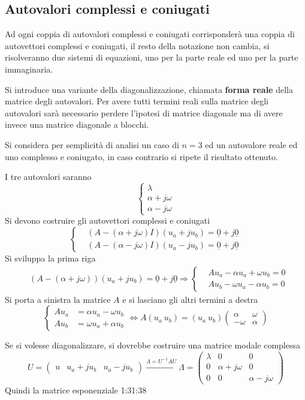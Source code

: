 \subsection{Autovalori complessi e coniugati}
Ad ogni coppia di autovalori complessi e coniugati corrisponderà una coppia di
autovettori complessi e coniugati, il resto della notazione non cambia, si
risolveranno due sistemi di equazioni, uno per la parte reale ed uno per la
parte immaginaria.

Si introduce una variante della diagonalizzazione, chiamata \textbf{forma
reale} della matrice degli autovalori.
Per avere tutti termini reali sulla matrice degli autovalori sarà necessario
perdere l'ipotesi di matrice diagonale ma di avere invece una matrice diagonale
a blocchi.

Si considera per semplicità di analisi un caso di $n=3$ ed un autovalore reale
ed uno complesso e coniugato, in caso contrario si ripete il risultato ottenuto.

I tre autovalori saranno
$$\left\{\begin{matrix}
\lambda \\ \alpha+j\omega \\ \alpha-j\omega
\end{matrix}\right.$$
Si devono costruire gli autovettori complessi e coniugati
$$\left\{\begin{aligned}
&(A-(\alpha+j\omega)I)(u_a+ju_b) = \underline{0} + j\underline{0}\\
&(A-(\alpha-j\omega)I)(u_a-ju_b) = \underline{0} + j\underline{0}
\end{aligned}\right.$$
Si sviluppa la prima riga
$$\begin{aligned}
&(A-(\alpha+j\omega))(u_a + ju_b) = \underline{0} +
j\underline{0}\Rightarrow
\left\{\begin{aligned}
&Au_a - \alpha u_a + \omega u_b = 0\\
&Au_b - \omega u_a -\alpha u_b = 0
\end{aligned}\right.
\end{aligned}$$
Si porta a sinistra la matrice $A$ e si lasciano gli altri termini a destra
$$
\left\{\begin{aligned}
Au_a &= \alpha u_a - \omega u_b \\
Au_b &= \omega u_a + \alpha u_b
\end{aligned}\right. \Leftrightarrow A (u_a \ u_b) = (u_a \ u_b)
\begin{pmatrix}
\alpha & \omega\\
-\omega & \alpha
\end{pmatrix}
$$

Se si volesse diagonalizzare, si dovrebbe costruire una matrice modale complessa
$$
U=\begin{pmatrix}u & u_a+ju_b & u_a-ju_b\end{pmatrix}
\stackrel{\Lambda=U^{-1}AU}{\rightarrow}\Lambda=
\begin{pmatrix}
\lambda & 0 & 0\\
0 & \alpha+j\omega & 0 \\
0 & 0 & \alpha -j\omega
\end{pmatrix}
$$
Quindi la matrice esponenziale 1:31:38

